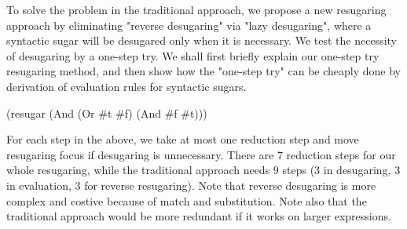To solve the problem in the traditional approach, we propose a new resugaring approach by eliminating "reverse desugaring" via "lazy desugaring", where a syntactic sugar will be desugared only when it is necessary. We test the necessity of desugaring by a one-step try. We shall first briefly explain our one-step try resugaring method, and then show how the "one-step try" can be cheaply done by derivation of evaluation rules for syntactic sugars.
\begin{Codes}
    (resugar (And (Or \#t \#f) (And \#f \#t)))
 
 
 
 
\end{Codes}

For each step in the above, we take at most one reduction step and move resugaring focus if desugaring is unnecessary. There are $7$ reduction steps for our whole resugaring, while the traditional approach needs $9$ steps ($3$ in desugaring, $3$ in evaluation, $3$ for reverse resugaring). Note that reverse desugaring is more complex and costive because of match and substitution. Note also that the traditional approach would be more redundant if it works on larger expressions.

